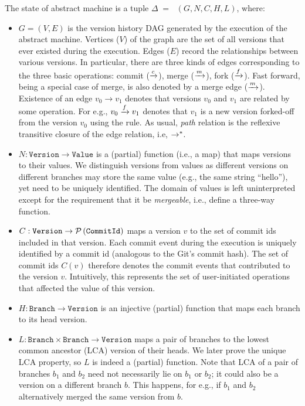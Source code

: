 The state of \quark abstract machine is a tuple $\Delta \;=\; $ 
$(G,N,C,H,L)$, where:
\begin{itemize}
  \item $G = (V,E)$ is the version history DAG generated by the
    execution of the abstract machine. Vertices ($V$) of the graph are
    the set of all versions that ever existed during the execution.
    Edges ($E$) record the relationships between various versions. In
    particular, there are three kinds of edges corresponding to the
    three basic operations: commit ($\xrightarrow{c}$), merge ($\xrightarrow{m}$), fork
    ($\xrightarrow{f}$). Fast forward, being a special case of merge, is also
    denoted by a merge edge ($\xrightarrow{m}$). Existence of an edge $v_0
    \rightarrow  v_1$ denotes that versions $v_0$ and $v_1$ are related by
    some operation. For e.g., $v_0 \xrightarrow{f} v_1$ denotes that $v_1$ is a
    new version forked-off from the version $v_0$ using the
     rule. As usual, \emph{path} relation is the
    reflexive transitive closure of the edge relation, i.e,
    $\rightarrow^{*}$.

  \item $N : \texttt{Version} \rightarrow \texttt{Value}$ is a
    (partial) function (i.e., a map) that maps versions to their
    values.  We distinguish versions from values as different versions
    on different branches may store the same value (e.g., the same
    string ``hello''), yet need to be uniquely identified. The domain
    of values is left uninterpreted except for the requirement that
    it be \emph{mergeable}, i.e., define a three-way 
    function.

  \item $C : \texttt{Version} \rightarrow \mathcal{P}\left(\texttt{CommitId}\right)$
    maps a version $v$ to the set of commit ids included in that
    version. Each commit event during the execution is uniquely
    identified by a commit id (analogous to the Git's commit hash).
    The set of commit ids $C(v)$ therefore denotes the commit events
    that contributed to the version $v$. Intuitively, this represents
    the set of user-initiated operations that affected the value of
    this version.

  \item $H : \texttt{Branch} \rightarrow \texttt{Version}$ is an
    injective (partial) function that maps each branch to its head
    version. 

  \item $L: \texttt{Branch}\times\texttt{Branch} \rightarrow
    \texttt{Version}$ maps a pair of branches to the lowest common
    ancestor (LCA) version of their heads. We later prove the unique
    LCA property, so $L$ is indeed a (partial) function. Note that LCA
    of a pair of branches $b_1$ and $b_2$ need not necessarily lie on
    $b_1$ or $b_2$; it could also be a version on a different branch
    $b$. This happens, for e.g., if $b_1$ and $b_2$ alternatively
    merged the same version from $b$.
\end{itemize}

